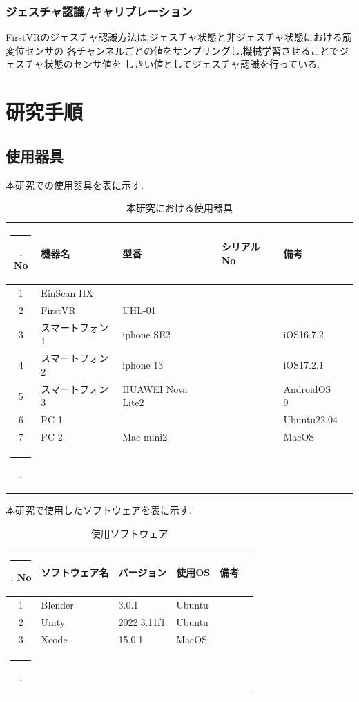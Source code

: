 \documentclass{ltjsreport}
\makeatletter
\def\Hline{
  \noalign{\ifnum0=`}\fi\hrule \@height 3.\arrayrulewidth \futurelet
  \reserved@a\@xhline}
\makeatother
\begin{document}
		\subsection{ジェスチャ認識/キャリブレーション}
			FirstVRのジェスチャ認識方法は,ジェスチャ状態と非ジェスチャ状態における筋変位センサの
			各チャンネルごとの値をサンプリングし,機械学習させることでジェスチャ状態のセンサ値を
			しきい値としてジェスチャ認識を行っている.

\chapter{研究手順}
	\section{使用器具}
		本研究での使用器具を表に示す.
	\begin{table}[H]
	\begin{center}
	\caption{本研究における使用器具}
	\label{tab:usedev}
	\begin{tabular}{clllll} \Hline
	No&\multicolumn{1}{l}{機器名}&\multicolumn{1}{l}{型番}&\multicolumn{1}{l}{シリアルNo}&\multicolumn{1}{l}{備考}\\ \hline
	1&EinScan HX&&&\\
	2&FirstVR&UHL-01&&\\
	3&スマートフォン1&iphone SE2&&iOS16.7.2\\
	4&スマートフォン2&iphone 13&&iOS17.2.1\\
	5&スマートフォン3&HUAWEI Nova Lite2&&AndroidOS 9\\
	6&PC-1&&&Ubuntu22.04\\
	7&PC-2&Mac mini2&&MacOS\\
	\Hline
	\end{tabular}
	\end{center}
	\end{table}
	本研究で使用したソフトウェアを表に示す.
	\begin{table}[H]
	\begin{center}
	\caption{使用ソフトウェア}
	\label{tab:usesoft}
	\begin{tabular}{clllll} \Hline
	No&\multicolumn{1}{l}{ソフトウェア名}&\multicolumn{1}{l}{バージョン}&\multicolumn{1}{l}{使用OS}&\multicolumn{1}{l}{備考}\\ \hline
	1&Blender&3.0.1&Ubuntu&\\
	2&Unity&2022.3.11f1&Ubuntu&\\
	3&Xcode&15.0.1&MacOS&\\
	\Hline
	\end{tabular}
	\end{center}
	\end{table}
\vspace{-15pt}
\end{document}
